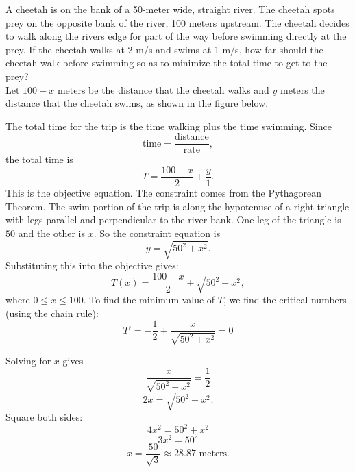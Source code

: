 \documentclass[handout]{ximera}
\begin{document}
\begin{example}[example 5]
A cheetah is on the bank of a 50-meter wide, straight river.   The cheetah spots prey on the opposite 
bank of the river, 100 meters upstream. 
The cheetah decides to walk along the rivers edge for part of the way before swimming directly at the prey. 
If the cheetah walks at 2 m/s and swims at 1 m/s,
how far should the cheetah walk before swimming so as to minimize the total time to get to the prey?\\

Let $100 -x$ meters be the distance that the cheetah walks and $y$ meters the distance that the cheetah swims, 
as shown in the figure below. 


\begin{image}
\end{image}

The total time for the trip is the time walking plus the time swimming. Since 
\[
\text{time} = \frac{\text{distance}}{\text{rate}},
\]
the total time is 
\[
T = \frac{100-x}{2} + \frac{y}{1}.
\]
This is the objective equation.
The constraint comes from the Pythagorean Theorem. The swim portion of the trip is along the hypotenuse of a right triangle 
with legs parallel and perpendicular to the river bank. One leg of the triangle is $50$ and the other is $x$.  
So the constraint equation is
\[
y = \sqrt{50^2 + x^2}.
\]
Substituting this into the objective gives:
\[
T(x) = \frac{100-x}{2} + \sqrt{50^2 + x^2},\]
where $0 \leq x \leq 100$.
To find the minimum value of $T$, we find the critical numbers (using the chain rule):
\[
T'  = -\frac12 + \frac{x}{\sqrt{50^2 + x^2}} = 0
\]

Solving for $x$ gives
\[
\frac{x}{\sqrt{50^2 + x^2}} = \frac12
\]
\[
2x = \sqrt{50^2 + x^2}.
\]
Square both sides:
\[
4x^2 = 50^2 + x^2
\]
\[
3x^2 = 50^2
\]
\[
x = \frac{50}{\sqrt{3}} \approx 28.87 \text{ meters}.
\]



\end{example}
\end{document}
